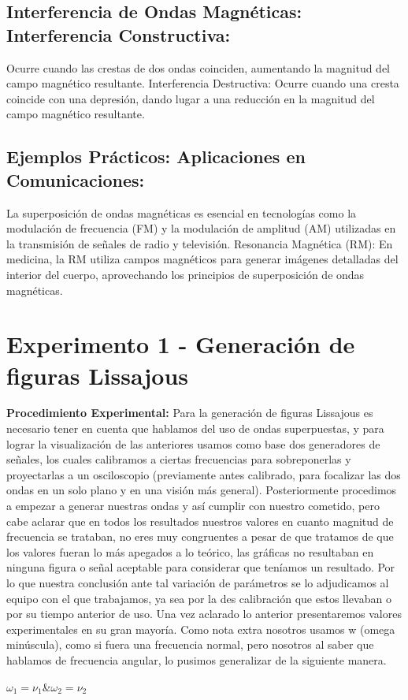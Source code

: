 \documentclass[10pt]{article}
\begin{document}
\begin{multicols}{2}
 \subsection{Interferencia de Ondas Magnéticas: Interferencia Constructiva:} Ocurre cuando las crestas de dos ondas coinciden, aumentando la magnitud del campo magnético resultante. Interferencia Destructiva: Ocurre cuando una cresta coincide con una depresión, dando lugar a una reducción en la magnitud del campo magnético resultante.
 \subsection{Ejemplos Prácticos: Aplicaciones en Comunicaciones:} 
 La superposición de ondas magnéticas es esencial en tecnologías como la modulación de frecuencia (FM) y la modulación de amplitud (AM) utilizadas en la transmisión de señales de radio y televisión. Resonancia Magnética (RM): En medicina, la RM utiliza campos magnéticos para generar imágenes detalladas del interior del cuerpo, aprovechando los principios de superposición de ondas magnéticas.

\section{Experimento 1 - Generación de figuras Lissajous}
 \textbf{Procedimiento Experimental:}
 Para la generación de figuras Lissajous es necesario tener en cuenta que hablamos del uso de ondas superpuestas, y para lograr la visualización de las anteriores usamos como base dos generadores de señales, los cuales calibramos a ciertas frecuencias para sobreponerlas y proyectarlas a un osciloscopio (previamente antes calibrado, para focalizar las dos ondas en un solo plano y en una visión más general).
 Posteriormente procedimos a empezar a generar nuestras ondas y así cumplir con nuestro cometido, pero cabe aclarar que en todos los resultados nuestros valores en cuanto magnitud de frecuencia se trataban, no eres muy congruentes a pesar de que tratamos de que los valores fueran lo más apegados a lo teórico, las gráficas no resultaban en ninguna figura o señal aceptable para considerar que teníamos un resultado. Por lo que nuestra conclusión ante tal variación de parámetros se lo adjudicamos al equipo con el que trabajamos, ya sea por la des calibración que estos llevaban o por su tiempo anterior de uso. Una vez aclarado lo anterior presentaremos valores experimentales en su gran mayoría.
 Como nota extra nosotros usamos w (omega minúscula), como si fuera una frecuencia normal, pero nosotros al saber que hablamos de frecuencia angular, lo pusimos generalizar de la siguiente manera. \\ 
 \begin{center}
$\omega_{1}=\nu_{1}$\&$\omega_{2}=\nu_{2}$\\
 \end{center}
 


\end{multicols}
\end{document}
